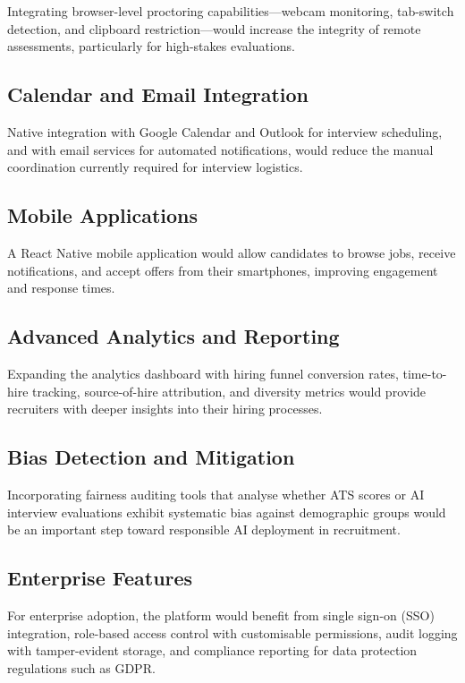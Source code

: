 Integrating browser-level proctoring capabilities---webcam monitoring, tab-switch detection, and clipboard restriction---would increase the integrity of remote assessments, particularly for high-stakes evaluations.

\subsection{Calendar and Email Integration}

Native integration with Google Calendar and Outlook for interview scheduling, and with email services for automated notifications, would reduce the manual coordination currently required for interview logistics.

\subsection{Mobile Applications}

A React Native mobile application would allow candidates to browse jobs, receive notifications, and accept offers from their smartphones, improving engagement and response times.

\subsection{Advanced Analytics and Reporting}

Expanding the analytics dashboard with hiring funnel conversion rates, time-to-hire tracking, source-of-hire attribution, and diversity metrics would provide recruiters with deeper insights into their hiring processes.

\subsection{Bias Detection and Mitigation}

Incorporating fairness auditing tools that analyse whether ATS scores or AI interview evaluations exhibit systematic bias against demographic groups would be an important step toward responsible AI deployment in recruitment.

\subsection{Enterprise Features}

For enterprise adoption, the platform would benefit from single sign-on (SSO) integration, role-based access control with customisable permissions, audit logging with tamper-evident storage, and compliance reporting for data protection regulations such as GDPR.

